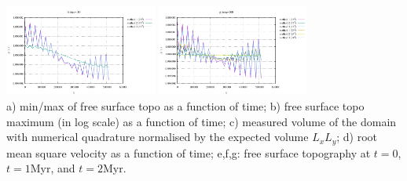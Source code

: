 \begin{center}
\includegraphics[width=5cm]{python_codes/fieldstone_54/images/surface_topography_100.pdf}
\includegraphics[width=5cm]{python_codes/fieldstone_54/images/surface_topography_200.pdf}\\
{\scriptsize 
a) min/max of free surface topo as a function of time; 
b) free surface topo maximum (in log scale) as a function of time; 
c) measured volume of the domain with numerical quadrature normalised by the expected volume $L_xL_y$;
d) root mean square velocity as a function of time;
e,f,g: free surface topography at $t=0$, $t=1$Myr, and $t=2$Myr.}
\end{center}
